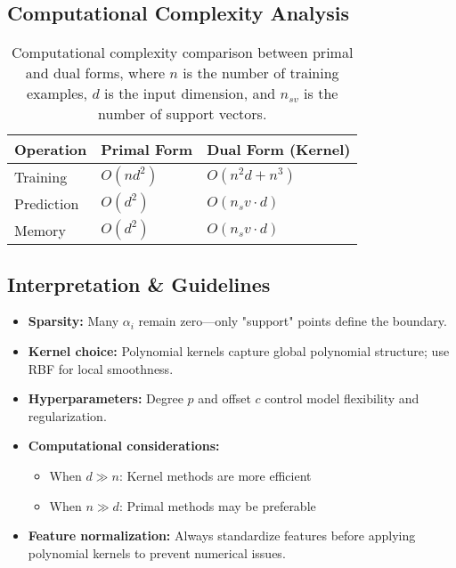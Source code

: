 \documentclass[11pt]{article}
\begin{document}
\subsection{Computational Complexity Analysis}
\begin{table}[h]
  \centering
  \begin{tabular}{|l|l|l|}
    \hline
    \textbf{Operation} & \textbf{Primal Form} & \textbf{Dual Form (Kernel)} \\
    \hline
    Training & $O(nd^2)$ & $O(n^2d + n^3)$ \\
    \hline
    Prediction & $O(d^2)$ & $O(n_sv \cdot d)$ \\
    \hline
    Memory & $O(d^2)$ & $O(n_sv \cdot d)$ \\
    \hline
  \end{tabular}
  \caption{Computational complexity comparison between primal and dual forms, where $n$ is the number of training examples, $d$ is the input dimension, and $n_{sv}$ is the number of support vectors.}
\end{table}

\subsection{Interpretation \& Guidelines}
\begin{itemize}
  \item \textbf{Sparsity:} Many $\alpha_i$ remain zero—only "support" points define the boundary.
  \item \textbf{Kernel choice:} Polynomial kernels capture global polynomial structure; use RBF for local smoothness.
  \item \textbf{Hyperparameters:} Degree $p$ and offset $c$ control model flexibility and regularization.
  \item \textbf{Computational considerations:} 
    \begin{itemize}
      \item When $d \gg n$: Kernel methods are more efficient
      \item When $n \gg d$: Primal methods may be preferable
    \end{itemize}
  \item \textbf{Feature normalization:} Always standardize features before applying polynomial kernels to prevent numerical issues.
\end{itemize}
\end{document}
